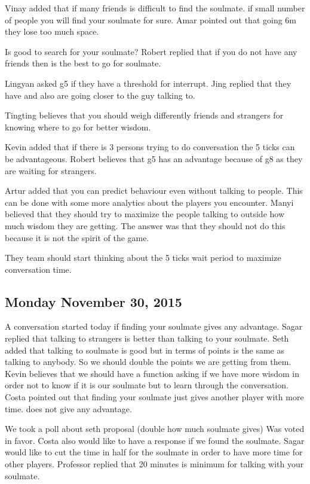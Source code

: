 Vinay added that if many friends is difficult to find the soulmate. if small number of people you will find your soulmate for sure.
Amar pointed out that going 6m they lose too much space.

Is good to search for your soulmate?
Robert replied that if you do not have any friends then is the best to go for soulmate.

Lingyan asked g5 if they have a threshold for interrupt.
Jing replied that they have and also are going closer to the guy talking to.

Tingting believes that you should weigh differently friends and strangers for knowing where to go for better wisdom.

Kevin added that if there is 3 persons trying to do conversation the 5 ticks can be advantageous.
Robert believes that g5 has an advantage because of g8 as they are waiting for strangers.

Artur added that you can predict behaviour even without talking to people. This can be done with some more analytics about the players you encounter.
Manyi believed that they should try to maximize the people talking to outside how much wisdom they are getting. The answer was that they should not do this because it is not the spirit of the game.

They team should start thinking about the 5 ticks wait period to maximize conversation time.

\subsection{Monday November 30, 2015}
A conversation started today if finding your soulmate gives any advantage.
Sagar replied that talking to strangers is better than talking to your soulmate.
Seth added that talking to soulmate is good but in terms of points is the same as talking to anybody. So we should double the points we are getting from them.
Kevin believes that we should have a function asking if we have more wisdom in order not to know if it is our soulmate but to learn through the conversation.
Costa pointed out that finding your soulmate just gives another player with more time. does not give any advantage.

We took a poll about seth proposal (double how much soulmate gives)
Was voted in favor.
Costa also would like to have a response if we found the soulmate.
Sagar would like to cut the time in half for the soulmate in order to have more time for other players.
Professor replied that 20 minutes is minimum for talking with your soulmate.

